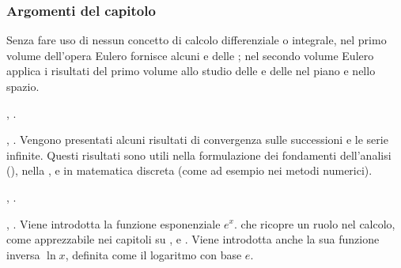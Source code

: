 \documentclass[letterpaper,10pt,italian]{jupyterBook}
\begin{document}
\subsubsection*{Argomenti del capitolo}

\sphinxAtStartPar
Senza fare uso di nessun concetto di calcolo differenziale o integrale, nel primo volume dell’opera Eulero fornisce alcuni  e delle ; nel secondo volume Eulero applica i risultati del primo volume allo studio delle  e delle  nel piano e nello spazio.

\sphinxAtStartPar
{\hyperref[\detokenize{ch/precalculus/real-functions:math-hs-precalculus-real-functions}]{}}, . 

\sphinxAtStartPar
{\hyperref[\detokenize{ch/series:math-hs-series}]{}}, . Vengono presentati alcuni risultati di convergenza sulle successioni e le serie infinite. Questi risultati sono utili nella formulazione dei fondamenti dell’analisi (), nella {\hyperref[\detokenize{ch/exponential_logarithm:math-hs-exp-def}]{}}, e in matematica discreta (come ad esempio nei metodi numerici).

\sphinxAtStartPar
{\hyperref[\detokenize{ch/precalculus/multivariable-real-fun:math-hs-precalculus-multivariable-real-fun}]{}}, . 

\sphinxAtStartPar
{\hyperref[\detokenize{ch/exponential_logarithm:math-hs-exp-log}]{}}, . Viene introdotta la funzione esponenziale \(e^x\). che ricopre un ruolo  nel calcolo, come apprezzabile nei capitoli su {\hyperref[\detokenize{ch/infinitesimal_calculus/derivatives:infinitesimal-calculus-derivatives}]{}}, {\hyperref[\detokenize{ch/infinitesimal_calculus/integrals:infinitesimal-calculus-integrals}]{}} e {\hyperref[\detokenize{ch/ode:ode-hs}]{}}.
Viene introdotta anche la sua funzione inversa \(\ln x\), definita come il logaritmo con base \(e\).
\end{document}

